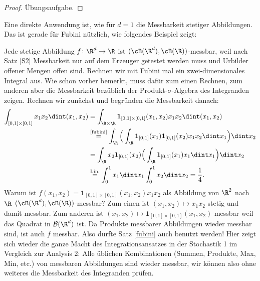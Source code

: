 \begin{proof}
	Übungsaufgabe.
\end{proof}
Eine direkte Anwendung ist, wie f\"ur $d=1$ die Messbarkeit stetiger Abbildungen. Das ist gerade f\"ur Fubini n\"utzlich, wie folgendes Beispiel zeigt:
\begin{anwendung}
	Jede stetige Abbildung $f\colon \R^d \to \R$ ist $(\cB(\R^d), \cB(\R))$-messbar, weil nach Satz \ref{S2} Messbarkeit nur auf dem Erzeuger getestet werden muss und Urbilder offener Mengen offen sind. Rechnen wir mit Fubini mal ein zwei-dimensionales Integral aus. Wie schon vorher bemerkt, muss daf\"ur zum einen Rechnen, zum anderen aber die Messbarkeit bez\"ublich der Produkt-$\sigma$-Algebra des Integranden zeigen. Rechnen wir zun\"achst und begr\"unden die Messbarkeit danach:
	\begin{align*}
		\int_{[0,1] \times [0,1]} x_1 x_2 \dint (x_1,x_2) &= \int_{\R \times \R} \mathbf{1}_{[0,1] \times [0,1]}(x_1,x_2) x_1x_2 \dint (x_1,x_2)\\ 
		&\overset{\text{\ref{fubini}}}{=} \int_{\R}\Big( \int_{\R} \mathbf{1}_{[0,1]}(x_1) \mathbf{1}_{[0,1]}(x_2) x_1 x_2 \dint x_1\Big) \dint x_2\\
		& = \int_{\R} x_2 \mathbf{1}_{[0,1]}(x_2) \Big(\int_{\R} \mathbf{1}_{[0,1]}(x_1) x_1 \dint x_1\Big) \dint x_2\\
		& \overset{\text{Lin.}}{=} \int_0^1 x_1 \dint x_1\int_0^1 x_2  \dint x_2 = \frac{1}{4}.
	\end{align*}
	Warum ist $f(x_1,x_2)=\mathbf{1}_{[0,1] \times [0,1]}(x_1,x_2) x_1x_2$ als Abbildung von $\R^2$ nach $\R$ $(\cB(\R^d), \cB(\R))$-messbar? Zum einen ist $(x_1,x_2)\mapsto x_1x_2$ stetig und damit messbar. Zum anderen ist $(x_1,x_2)\mapsto \mathbf{1}_{[0,1] \times [0,1]}(x_1,x_2)$ messbar weil das Quadrat in $\mathcal B(\R^d)$ ist. Da Produkte messbarer Abbildungen wieder messbar sind, ist auch $f$ messbar. Also durfte Satz \ref{fubini} auch benutzt werden! Hier zeigt sich wieder die ganze Macht des Integrationsansatzes in der Stochastik 1 im Vergleich zur Analysis 2: Alle \"ublichen Kombinationen (Summen, Produkte, Max, Min, etc.) von messbaren Abbildungen sind wieder messbar, wir k\"onnen also ohne weiteres die Messbarkeit des Integranden pr\"ufen.
\end{anwendung}

